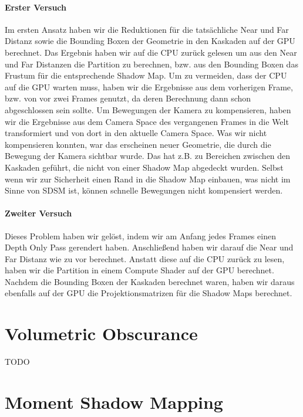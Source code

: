 \documentclass[runningheaders,a4paper]{llncs}
\begin{document}
\paragraph{Erster Versuch}
Im ersten Ansatz haben wir die Reduktionen für die tatsächliche Near und Far Distanz sowie die Bounding Boxen der Geometrie in den Kaskaden auf der GPU berechnet.
Das Ergebnis haben wir auf die CPU zurück gelesen um aus den Near und Far Distanzen die Partition zu berechnen, bzw. aus den Bounding Boxen das Frustum für die entsprechende Shadow Map.
Um zu vermeiden, dass der CPU auf die GPU warten muss, haben wir die Ergebnisse aus dem vorherigen Frame, bzw. von vor zwei Frames genutzt, da deren Berechnung dann schon abgeschlossen sein sollte.
Um Bewegungen der Kamera zu kompensieren, haben wir die Ergebnisse aus dem Camera Space des vergangenen Frames in die Welt transformiert und von dort in den aktuelle Camera Space.
Was wir nicht kompensieren konnten, war das erscheinen neuer Geometrie, die durch die Bewegung der Kamera sichtbar wurde.
Das hat z.B. zu Bereichen zwischen den Kaskaden geführt, die nicht von einer Shadow Map abgedeckt wurden.
Selbst wenn wir zur Sicherheit einen Rand in die Shadow Map einbauen, was nicht im Sinne von SDSM ist, können schnelle Bewegungen nicht kompensiert werden.

\paragraph{Zweiter Versuch}
Dieses Problem haben wir gelöst, indem wir am Anfang jedes Frames einen Depth Only Pass gerendert haben.
Anschließend haben wir darauf die Near und Far Distanz wie zu vor berechnet.
Anstatt diese auf die CPU zurück zu lesen, haben wir die Partition in einem Compute Shader auf der GPU berechnet.
Nachdem die Bounding Boxen der Kaskaden berechnet waren, haben wir daraus ebenfalls auf der GPU die Projektionsmatrizen für die Shadow Maps berechnet.




\section{Volumetric Obscurance}

	TODO
	



\section{Moment Shadow Mapping}
\end{document}
